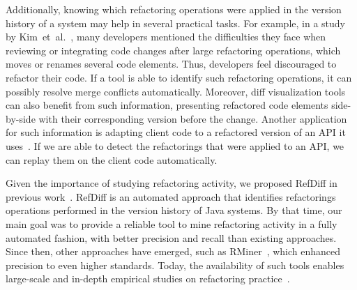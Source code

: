Additionally, knowing which refactoring operations were applied in the version history of a system may help in several practical tasks.
For example, in a study by Kim~et~al.~\cite{Kim:2012:FSE}, many developers mentioned the difficulties they face when reviewing or integrating code changes after large refactoring operations, which moves or renames several code elements. Thus, developers feel discouraged to refactor their code. If a tool is able to identify such refactoring operations, it can possibly resolve merge conflicts automatically. 
Moreover, diff visualization tools can also benefit from such information, presenting refactored code elements side-by-side with their corresponding version before the change.
Another application for such information is adapting client code to a refactored version of an API it uses~\cite{henkel2005catchup, Xing:2008:JDevAn}. If we are able to detect the refactorings that were applied to an API, we can replay them on the client code automatically.


Given the importance of studying refactoring activity, we proposed RefDiff in previous work~\cite{msr2017}. RefDiff is an automated approach that identifies refactorings operations performed in the version history of Java systems.
By that time, our main goal was to provide a reliable tool to mine refactoring activity in a fully automated fashion, with better precision and recall than existing approaches. Since then, other approaches have emerged, such as RMiner~\cite{tsantalis2018rminer}, which enhanced precision to even higher standards.
Today, the availability of such tools enables large-scale and in-depth empirical studies on refactoring practice~\cite{fse2016-why-we-refactor, icse2018}.

